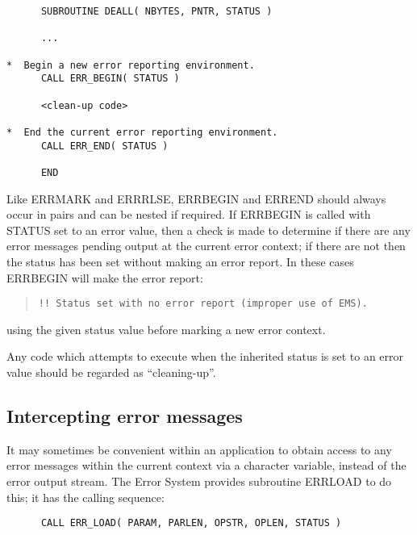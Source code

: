 \documentclass[twoside,11pt]{article}
\newcommand{\xlabel}[1]{}
\renewcommand{\_}{\texttt{\symbol{95}}}
\begin{document}
\begin {small}
\begin{verbatim}
      SUBROUTINE DEALL( NBYTES, PNTR, STATUS )

      ...

*  Begin a new error reporting environment.
      CALL ERR_BEGIN( STATUS )

      <clean-up code>

*  End the current error reporting environment.
      CALL ERR_END( STATUS )

      END
\end{verbatim}
\end {small}

Like ERR\_MARK and ERR\_RLSE, ERR\_BEGIN and ERR\_END should always occur in
pairs and can be nested if required.
If ERR\_BEGIN is called with STATUS set to an error value, then a check is
made to determine if there are any error messages pending output at the
current error context; if there are not then the status has been set without
making an error report.
In these cases ERR\_BEGIN will make the error report:

\begin {quote}
\begin {small}
\begin{verbatim}
!! Status set with no error report (improper use of EMS).
\end{verbatim}
\end {small}
\end{quote}

using the given status value before marking a new error context.

Any code which attempts to execute when the inherited status is set to an error
value should be regarded as ``cleaning-up''.

\subsection{\xlabel{intercepting_error_messages}Intercepting error messages \label{intcpt_sect}}
It may sometimes be convenient within an application to obtain access to any
error messages within the current context via a character variable,
instead of the error output stream.
The Error System provides subroutine ERR\_LOAD to do this; it has the
calling sequence:

\begin {small}
\begin{verbatim}
      CALL ERR_LOAD( PARAM, PARLEN, OPSTR, OPLEN, STATUS )
\end{verbatim}
\end {small}
\end{document}
